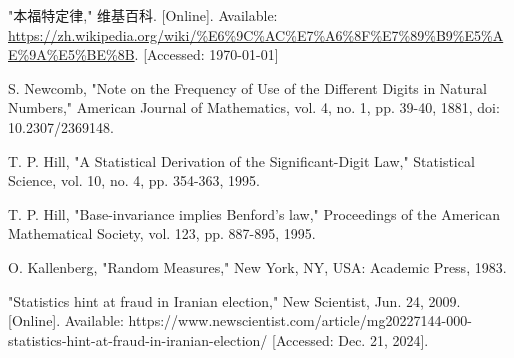 \documentclass{ctexart} %
\begin{document}
\begin{thebibliography}{9}
    "本福特定律," 维基百科. [Online]. Available: \url{https://zh.wikipedia.org/wiki/%E6%9C%AC%E7%A6%8F%E7%89%B9%E5%AE%9A%E5%BE%8B}. [Accessed: \today]
    
    S. Newcomb, "Note on the Frequency of Use of the Different Digits in Natural Numbers," American Journal of Mathematics, vol. 4, no. 1, pp. 39-40, 1881, doi: 10.2307/2369148.

    T. P. Hill, "A Statistical Derivation of the Significant-Digit Law," Statistical Science, vol. 10, no. 4, pp. 354-363, 1995.

    T. P. Hill, "Base-invariance implies Benford's law," Proceedings of the American Mathematical Society, vol. 123, pp. 887-895, 1995.

    O. Kallenberg, "Random Measures," New York, NY, USA: Academic Press, 1983.

    "Statistics hint at fraud in Iranian election," New Scientist, Jun. 24, 2009. [Online]. Available: https://www.newscientist.com/article/mg20227144-000-statistics-hint-at-fraud-in-iranian-election/ [Accessed: Dec. 21, 2024].
\end{thebibliography}
\end{document}
